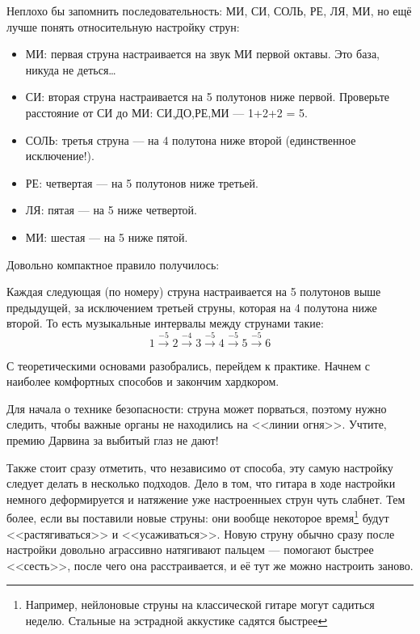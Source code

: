 Неплохо бы запомнить последовательность: МИ, СИ, СОЛЬ, РЕ, ЛЯ, МИ, но ещё лучше понять относительную настройку струн:
\begin{itemize}
    \item МИ: первая струна настраивается на звук МИ первой октавы. Это база, никуда не деться\ldots
    \item СИ: вторая струна настраивается на 5 полутонов ниже первой. Проверьте расстояние от СИ до МИ: СИ,ДО,РЕ,МИ --- 1+2+2 = 5.
    \item СОЛЬ: третья струна --- на 4 полутона ниже второй (единственное исключение!).
    \item РЕ: четвертая --- на 5 полутонов ниже третьей.
    \item ЛЯ: пятая --- на 5 ниже четвертой.
    \item МИ: шестая --- на 5 ниже пятой.
\end{itemize}

Довольно компактное правило получилось:
\begin{Rule}
    Каждая следующая (по номеру) струна настраивается на 5 полутонов выше предыдущей, за исключением третьей струны, которая на 4 полутона ниже второй. То есть музыкальные интервалы между струнами такие:
    \[
        \text{1}\xrightarrow{-5}
        \text{2}\xrightarrow{-4}
        \text{3}\xrightarrow{-5}
        \text{4}\xrightarrow{-5}
        \text{5}\xrightarrow{-5}
        \text{6}
    \]
\end{Rule}

С теоретическими основами разобрались, перейдем к практике. Начнем с наиболее комфортных способов и закончим хардкором.

Для начала о технике безопасности: струна может порваться, поэтому нужно следить, чтобы важные органы не находились на <<линии огня>>. Учтите, премию Дарвина за выбитый глаз не дают!

Также стоит сразу отметить, что независимо от способа, эту самую настройку следует делать в несколько подходов. Дело в том, что гитара в ходе настройки немного деформируется и натяжение уже настроенныех струн чуть слабнет. Тем более, если вы поставили новые струны: они вообще некоторое время\footnote{Например, нейлоновые струны на классической гитаре могут садиться неделю. Стальные на эстрадной аккустике садятся быстрее} будут <<растягиваться>> и <<усаживаться>>. Новую струну обычно сразу после настройки довольно аграссивно натягивают пальцем --- помогают быстрее <<сесть>>, после чего она расстраивается, и её тут же можно настроить заново.

